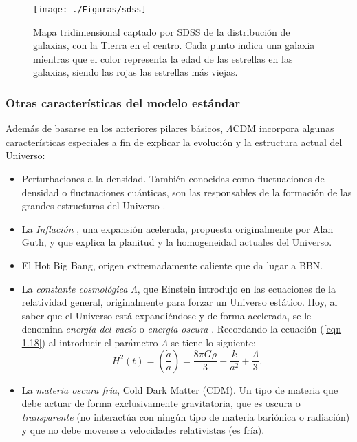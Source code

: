 \documentclass[a4paper,openright,12pt]{book}
\begin{document}
\begin{figure}
\centering
  \texttt{[image: ./Figuras/sdss]}
  \caption{\footnotesize{Mapa tridimensional captado por SDSS de la distribución de galaxias, con la Tierra en el centro. Cada punto indica una galaxia mientras que el color representa la edad de las estrellas en las galaxias, siendo las rojas las estrellas más viejas.}}
  \label{fig 1.5}
\end{figure}

\subsubsection*{Otras características del modelo estándar}
Además de basarse en los anteriores pilares básicos, $\Lambda$CDM incorpora algunas características especiales a fin de explicar la evolución y la estructura actual del Universo:
\begin{itemize}
\item Perturbaciones a la densidad. También conocidas como fluctuaciones de densidad o fluctuaciones cuánticas, son las responsables de la formación de las grandes estructuras del Universo \cite{1.2.3}.

\item La \textit{Inflación} \cite{1.2.1}, una expansión acelerada, propuesta originalmente por Alan Guth, y que explica la planitud y la homogeneidad actuales del Universo.

\item El Hot Big Bang, origen extremadamente caliente que da lugar a BBN.

\item La \textit{constante cosmológica} $\Lambda$, que Einstein introdujo en las ecuaciones de la relatividad general, originalmente para forzar un Universo estático. Hoy, al saber que el Universo está expandiéndose y de forma acelerada, se le denomina \textit{energía del vacío} o \textit{energía oscura} \cite{1.2.2}. Recordando la ecuación (\ref{eqn 1.18}) al introducir el parámetro $\Lambda$ se tiene lo siguiente:
\begin{equation}
H^{2}(t) = \left(\frac{\dot{a}}{a}\right)
= 
\frac{8 \pi G \rho}{3} - \frac{k}{a^{2}} + \frac{\Lambda}{3}.\label{eqn 1.43}
\end{equation}
\item La \textit{materia oscura fría}, Cold Dark Matter (CDM). Un tipo de materia que debe actuar de forma exclusivamente gravitatoria, que es oscura o \textit{transparente} (no interactúa con ningún tipo de materia bariónica o radiación) y que no debe moverse a velocidades relativistas (es fría).


\end{itemize}
\end{document}

